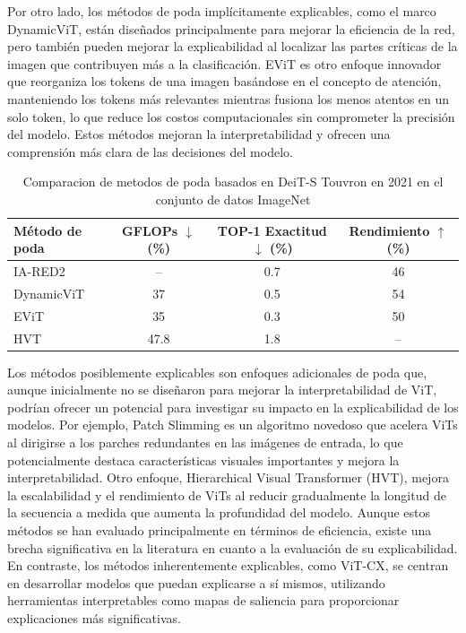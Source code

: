 Por otro lado, los métodos de poda implícitamente explicables, como el marco DynamicViT, están diseñados principalmente para mejorar la eficiencia de la red, pero también pueden mejorar la explicabilidad al localizar las partes críticas de la imagen que contribuyen más a la clasificación. EViT es otro enfoque innovador que reorganiza los tokens de una imagen basándose en el concepto de atención, manteniendo los tokens más relevantes mientras fusiona los menos atentos en un solo token, lo que reduce los costos computacionales sin comprometer la precisión del modelo. Estos métodos mejoran la interpretabilidad y ofrecen una comprensión más clara de las decisiones del modelo.   

\begin{table}[H]
	\centering
	\caption{ Comparacion de metodos de poda basados en DeiT-S Touvron en 2021 en el conjunto de datos ImageNet}
	\label{tab:pruning_comparison}
	\begin{tabular}{lccc}
		\toprule
		Método de poda & GFLOPs $\downarrow$ (\%) & TOP-1 Exactitud $\downarrow$ (\%) & Rendimiento $\uparrow$ (\%) \\
		\midrule
		IA-RED2        & --                        & 0.7                               & 46                            \\
		DynamicViT     & 37                        & 0.5                               & 54                            \\
		EViT           & 35                        & 0.3                               & 50                            \\
		
		HVT            & 47.8                      & 1.8                               & --                            \\
		\bottomrule
	\end{tabular}
\end{table}


Los métodos posiblemente explicables son enfoques adicionales de poda que, aunque inicialmente no se diseñaron para mejorar la interpretabilidad de ViT, podrían ofrecer un potencial para investigar su impacto en la explicabilidad de los modelos. Por ejemplo, Patch Slimming es un algoritmo novedoso que acelera ViTs al dirigirse a los parches redundantes en las imágenes de entrada, lo que potencialmente destaca características visuales importantes y mejora la interpretabilidad. Otro enfoque, Hierarchical Visual Transformer (HVT), mejora la escalabilidad y el rendimiento de ViTs al reducir gradualmente la longitud de la secuencia a medida que aumenta la profundidad del modelo. Aunque estos métodos se han evaluado principalmente en términos de eficiencia, existe una brecha significativa en la literatura en cuanto a la evaluación de su explicabilidad. En contraste, los métodos inherentemente explicables, como ViT-CX, se centran en desarrollar modelos que puedan explicarse a sí mismos, utilizando herramientas interpretables como mapas de saliencia para proporcionar explicaciones más significativas.


